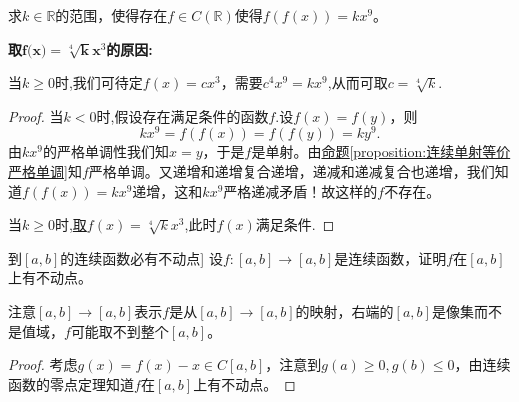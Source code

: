 \documentclass[../../main.tex]{subfiles}%
\begin{document}
\begin{example}
求\(k\in\mathbb{R}\)的范围，使得存在\(f\in C(\mathbb{R})\)使得\(f(f(x)) = kx^{9}\)。
\end{example}
\begin{note}
\hypertarget{取这个函数的原因}{\textbf{取$\boldsymbol{f}\mathbb{(}\boldsymbol{x}\mathbb{)}=\sqrt[4]{\boldsymbol{k}}\boldsymbol{x}^{3}$的原因:}}当\(k\geqslant0\)时,我们可待定\(f(x)=cx^{3}\)，需要\(c^{4}x^{9}=kx^{9}\),从而可取\(c = \sqrt[4]{k}\).
\end{note}
\begin{proof}

当$k<0$时,假设存在满足条件的函数$f$.设\(f(x)=f(y)\)，则
\[
kx^{9}=f(f(x)) = f(f(y)) = ky^{9}.
\]
由\(kx^{9}\)的严格单调性我们知\(x = y\)，于是\(f\)是单射。由\hyperref[proposition:连续单射等价严格单调]{命题\ref{proposition:连续单射等价严格单调}}知\(f\)严格单调。又递增和递增复合递增，递减和递减复合也递增，我们知道\(f(f(x)) = kx^{9}\)递增，这和\(kx^{9}\)严格递减矛盾！故这样的\(f\)不存在。

当\(k\geqslant0\)时,\hyperlink{取这个函数的原因}{取$f(x)=\sqrt[4]{k}x^3$},此时$f(x)$满足条件.

\end{proof}

\begin{proposition}[\([a,b]\)到\([a,b]\)的连续函数必有不动点]\label{proposition:[a,b]到[a,b]的连续函数必有不动点}
设\(f:[a,b]\to[a,b]\)是连续函数，证明\(f\)在\([a,b]\)上有不动点。
\end{proposition}
\begin{note}
注意\([a,b]\to[a,b]\)表示\(f\)是从\([a,b]\to[a,b]\)的映射，右端的\([a,b]\)是像集而不是值域，\(f\)可能取不到整个\([a,b]\)。
\end{note}
\begin{proof}

考虑\(g(x)=f(x)-x\in C[a,b]\)，注意到\(g(a)\geqslant0,g(b)\leqslant0\)，由连续函数的零点定理知道\(f\)在\([a,b]\)上有不动点。

\end{proof}
\end{document}
